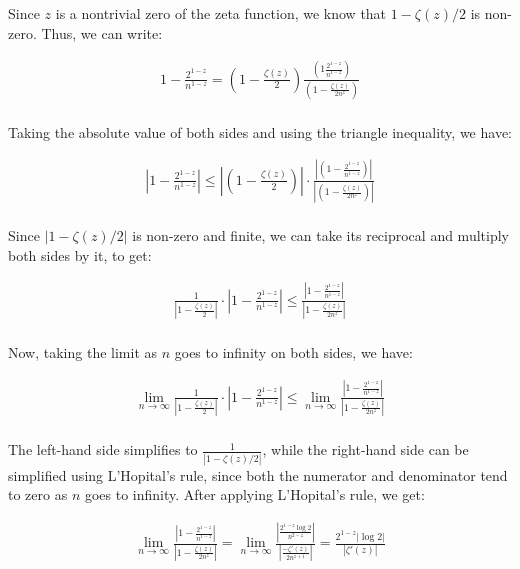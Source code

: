 \documentclass{article}
\begin{document}
Since $z$ is a nontrivial zero of the zeta function, we know that $1 - \zeta(z)/2$ is non-zero. Thus, we can write:

\begin{align*}
1 - \frac{2^{1-z}}{n^{1-z}} = \left(1 - \frac{\zeta(z)}{2}\right) \frac{\left(1\frac{2^{1-z}}{n^{1-z}}\right)}{\left(1 - \frac{\zeta(z)}{2n^{z}}\right)} \\
\end{align*}

Taking the absolute value of both sides and using the triangle inequality, we have:

\begin{align*}
\left|1 - \frac{2^{1-z}}{n^{1-z}}\right| \leq \left|\left(1 - \frac{\zeta(z)}{2}\right)\right| \cdot \frac{\left|\left(1 - \frac{2^{1-z}}{n^{1-z}}\right)\right|}{\left|\left(1 - \frac{\zeta(z)}{2n^{z}}\right)\right|} \\
\end{align*}

Since $|1 - \zeta(z)/2|$ is non-zero and finite, we can take its reciprocal and multiply both sides by it, to get:

\begin{align*}
\frac{1}{\left|1 - \frac{\zeta(z)}{2}\right|} \cdot \left|1 - \frac{2^{1-z}}{n^{1-z}}\right| \leq \frac{\left|1 - \frac{2^{1-z}}{n^{1-z}}\right|}{\left|1 - \frac{\zeta(z)}{2n^{z}}\right|} \\
\end{align*}

Now, taking the limit as $n$ goes to infinity on both sides, we have:

\begin{align*}
\lim_{n \to \infty} \frac{1}{\left|1 - \frac{\zeta(z)}{2}\right|} \cdot \left|1 - \frac{2^{1-z}}{n^{1-z}}\right| \leq \lim_{n \to \infty} \frac{\left|1 - \frac{2^{1-z}}{n^{1-z}}\right|}{\left|1 - \frac{\zeta(z)}{2n^{z}}\right|} \\
\end{align*}

The left-hand side simplifies to $\frac{1}{|1 - \zeta(z)/2|}$, while the right-hand side can be simplified using L'Hopital's rule, since both the numerator and denominator tend to zero as $n$ goes to infinity. After applying L'Hopital's rule, we get:

\begin{align*}
\lim_{n \to \infty} \frac{\left|1 - \frac{2^{1-z}}{n^{1-z}}\right|}{\left|1 - \frac{\zeta(z)}{2n^{z}}\right|} = \lim_{n \to \infty} \frac{\left|\frac{2^{1-z}\log 2}{n^{2-z}}\right|}{\left|\frac{-\zeta'(z)}{2n^{z+1}}\right|} = \frac{2^{1-z}|\log 2|}{|\zeta'(z)|} \\
\end{align*}
\end{document}
